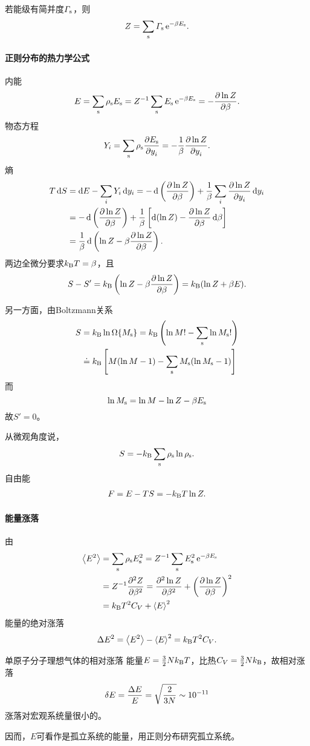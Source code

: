 若能级有简并度$\varGamma_\st$，则 
\begin{align}
	Z=\sum_\st\varGamma_\st\e{-\beta E_\st}.
\end{align}
\paragraph*{正则分布的热力学公式}内能
\begin{align}
	E=\sum_\st\rho_\st E_\st=Z^{-1}\sum_\st E_\st\e{-\beta E_\st}=-\pv{\ln Z}\beta.
\end{align}
物态方程
\begin{align}
	Y_i=\sum_\st\rho_\st\pv{E_\st}{y_i}=-\frac1\beta\pv{\ln Z}{y_i}.
\end{align}
熵
\begin{align*}
	T\d S&=\d E-\sum_i Y_i\d y_i=-\d\kh{\pv{\ln Z}\beta}+\frac1\beta\sum_i\pv{\ln Z}{y_i}\d y_i\\
	&=-\d\kh{\pv{\ln Z}\beta}+\frac1\beta\fkh{\d(\ln Z)-\pv{\ln Z}\beta\d\beta}\\
	&=\frac1\beta\d\kh{\ln Z-\beta\pv{\ln Z}\beta}.
\end{align*}
两边全微分要求$\kB T=\beta$，且 
\begin{align}
	S-S'=\kB\kh{\ln Z-\beta\pv{\ln Z}\beta}=\kB(\ln Z+\beta E).
\end{align}

另一方面，由Boltzmann关系
\begin{align*}
	S&=\kB\ln\Omega\{M_\st\}=\kB\kh{\ln M!-\sum_\st\ln M_\st!}\\
	&\doteq\kB\fkh{M(\ln M-1)-\sum_\st M_\st(\ln M_\st-1)}
\end{align*}
而
\[
	\ln M_\st=\ln M-\ln Z-\beta E_\st
\]
故$S'=0$。

从微观角度说，
\begin{align}
	S=-\kB\sum_\st\rho_\st\ln\rho_\st.
\end{align}
自由能
\begin{align}
	F=E-TS=-\kB T\ln Z.
\end{align}
\paragraph*{能量涨落}由
\begin{align*}
	\ave{E^2}&=\sum_\st\rho_\st E_\st^2=Z^{-1}\sum_\st E_\st^2\e{-\beta E_\st}\\
	&=Z^{-1}\pv[2]Z\beta=\pv[2]{\ln Z}\beta+\kh{\pv{\ln Z}\beta}^2\\
	&=\kB T^2C_V+\ave E^2
\end{align*}
能量的绝对涨落
\begin{align}
	\D E^2=\ave{E^2}-\ave E^2=\kB T^2C_V.
\end{align}
\begin{example}{单原子分子理想气体的相对涨落}{}
	能量$E=\frac32 N\kB T$，比热$C_V=\frac32N\kB$，故相对涨落
	\[
		\vd E=\frac{\D E}E=\sqrt{\frac2{3N}}\sim 10^{-11}
	\]
	涨落对宏观系统量很小的。
\end{example}
因而，$E$可看作是孤立系统的能量，用正则分布研究孤立系统。
